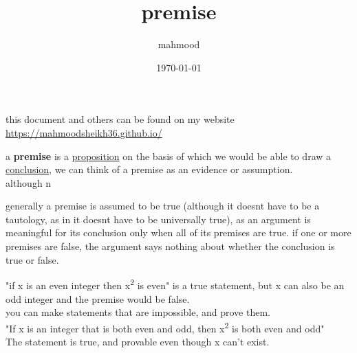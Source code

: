 \documentclass[a4paper,12pt]{article}
\author{mahmood}
\date{\today}
\title{premise}
\begin{document}
\maketitle
\begin{note}
this document and others can be found on my website\\
\url{https://mahmoodsheikh36.github.io/}
\end{note}
\begin{definition}
a \textbf{premise} is a \href{20230401175139-statement.org}{proposition} on the basis of which we would be able to draw a \href{20230524212250-conclusion.org}{conclusion}, we can think of a premise as an evidence or assumption.\\
although n\\
\end{definition}
\begin{characteristic}
generally a premise is assumed to be true (although it doesnt have to be a tautology, as in it doesnt have to be universally true), as an argument is meaningful for its conclusion only when all of its premises are true. if one or more premises are false, the argument says nothing about whether the conclusion is true or false.\\
\begin{my_example}
"if x is an even integer then x\textsuperscript{2} is even" is a true statement, but x can also be an odd integer and the premise would be false.\\
you can make statements that are impossible, and prove them.\\
"If x is an integer that is both even and odd, then x\textsuperscript{2} is both even and odd"\\
The statement is true, and provable even though x can't exist.\\
\end{my_example}
\end{characteristic}
\end{document}
